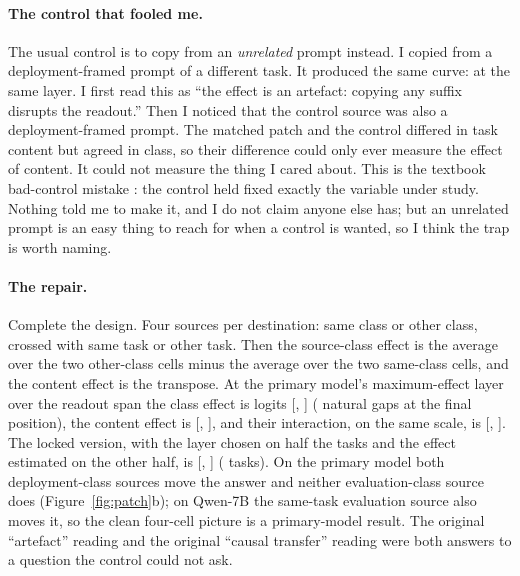 \documentclass[10pt]{article}
\begin{document}
\paragraph{The control that fooled me.} The usual control is to copy from an
\emph{unrelated} prompt instead. I copied from a deployment-framed prompt of a
different task. It produced the same curve: \NpatchCtrl{} at the same layer.
I first read this as ``the effect is an artefact: copying any suffix disrupts
the readout.'' Then I noticed that the control source was also a
deployment-framed prompt. The matched patch and the control differed in task
content but agreed in class, so their difference could only ever measure the
effect of content. It could not measure the thing I cared about. This is the
textbook bad-control mistake \citep{cinelli2022crash}: the control held fixed
exactly the variable under study. Nothing told me to make it, and I do not
claim anyone else has; but an unrelated prompt is an easy thing to reach for
when a control is wanted, so I think the trap is worth naming.

\paragraph{The repair.} Complete the design. Four sources per destination:
same class or other class, crossed with same task or other task. Then the
source-class effect is the average over the two other-class cells minus the
average over the two same-class cells, and the content effect is the
transpose. At the primary model's maximum-effect layer over the readout span
the class effect is \NmeClass{} logits [\NmeClassLo{}, \NmeClassHi{}]
(\VclassFinalOverGap{} natural gaps at the final position), the content
effect is \NmeContent{} [\NmeContentLo{}, \NmeContentHi{}], and their
interaction, on the same scale, is \NixnMean{} [\NixnLo{}, \NixnHi{}]. The
locked version, with the layer chosen on half the tasks and the effect
estimated on the other half, is \NlockClass{} [\NlockClassLo{},
\NlockClassHi{}] (\NlockClassN{} tasks). On the primary model both
deployment-class sources move the answer and neither evaluation-class source
does (Figure~\ref{fig:patch}b); on Qwen-7B the same-task evaluation source
also moves it, so the clean four-cell picture is a primary-model result.
The original ``artefact'' reading and the original ``causal transfer''
reading were both answers to a question the control could not ask.
\end{document}
